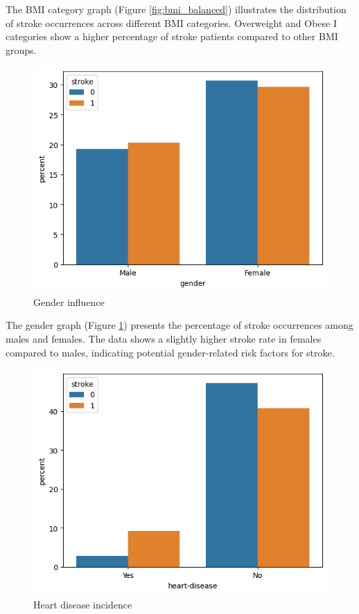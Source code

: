 \documentclass{Configuration_Files/Template}
\begin{document}
The BMI category graph (Figure \ref{fig:bmi_balanced}) illustrates the distribution of stroke occurrences across different BMI categories. Overweight and Obese I categories show a higher percentage of stroke patients compared to other BMI groups.

\begin{figure}[h]
\centering
\includegraphics[scale=0.4]{Images/gender_graph.png}
\caption{Gender influence}
\label{fig:gender}
\end{figure}

The gender graph (Figure \ref{fig:gender}) presents the percentage of stroke occurrences among males and females. The data shows a slightly higher stroke rate in females compared to males, indicating potential gender-related risk factors for stroke.

\begin{figure}[h]
\centering
\includegraphics[scale=0.4]{Images/heart_disease_graph.png}
\caption{Heart disease incidence}
\label{fig:heart}
\end{figure}
\end{document}
